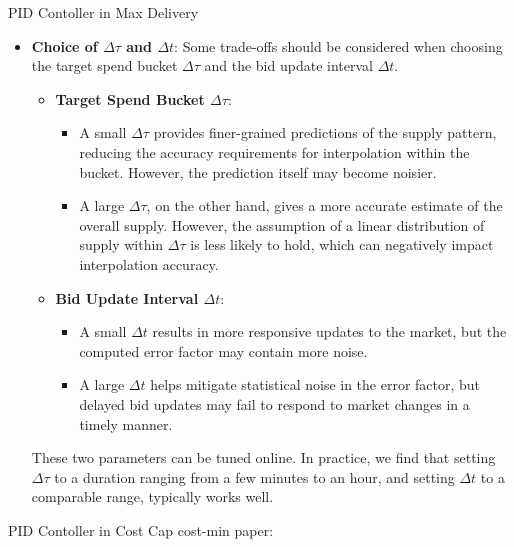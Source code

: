 \documentclass[../main.tex]{subfiles}
\begin{document}
\begin{section}{PID Contoller in Max Delivery}
\begin{itemize}
		\item \textbf{Choice of \(\Delta \tau\) and \(\Delta t\)}: Some trade-offs should be considered when choosing the target spend bucket \(\Delta \tau\) and the bid update interval \(\Delta t\). 
		
		\begin{itemize}
			\item \textbf{Target Spend Bucket \(\Delta \tau\)}: 
			\begin{itemize}
				\item A small \(\Delta \tau\) provides finer-grained predictions of the supply pattern, reducing the accuracy requirements for interpolation within the bucket. However, the prediction itself may become noisier.
				\item A large \(\Delta \tau\), on the other hand, gives a more accurate estimate of the overall supply. However, the assumption of a linear distribution of supply within \(\Delta \tau\) is less likely to hold, which can negatively impact interpolation accuracy.
			\end{itemize}
			\item \textbf{Bid Update Interval \(\Delta t\)}:
			\begin{itemize}
				\item A small \(\Delta t\) results in more responsive updates to the market, but the computed error factor may contain more noise.
				\item A large \(\Delta t\) helps mitigate statistical noise in the error factor, but delayed bid updates may fail to respond to market changes in a timely manner.
			\end{itemize}
		\end{itemize}
		
		These two parameters can be tuned online. In practice, we find that setting \(\Delta \tau\) to a duration ranging from a few minutes to an hour, and setting \(\Delta t\) to a comparable range, typically works well.
		
	\end{itemize}
	
	\end{section}
	
	
	\begin{section}{PID Contoller in Cost Cap}
		cost-min paper: \cite{kitts2017ad}
		
	\end{section}
	
	
\end{document}
